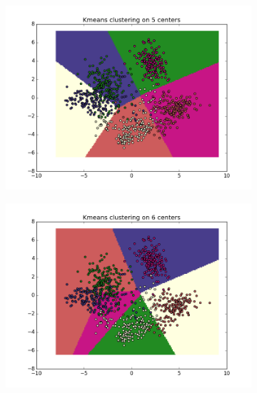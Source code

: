 \documentclass{article}
\begin{document}
\begin{center}
\begin{figure}
\centering  
        \begin{subfigure}[b]{0.48\textwidth}
                \centering
                \includegraphics[width=\linewidth]{figure_3}
        \end{subfigure}\hfill
        \begin{subfigure}[b]{0.48\textwidth}
                \centering
                \includegraphics[width=\linewidth]{figure_4}
        \end{subfigure}
        \label{fig:2}
\end{figure}


\end{center}
\end{document}

